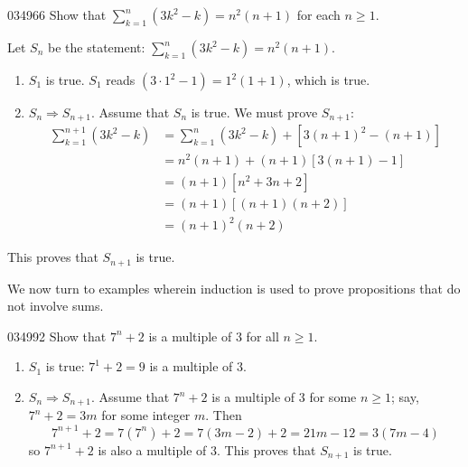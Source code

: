 \begin{example}{}{034966}
Show that $\sum_{k=1}^{n} (3k^2-k) = n^2(n+1)$ for each $n \geq 1$.


\begin{solution}
  Let $S_{n}$ be the statement: $\sum_{k=1}^{n} (3k^2-k) = n^2(n+1)$.


\begin{enumerate}
\item $S_{1}$ is true. $S_{1}$ reads $(3 \cdot 1^2 - 1) = 1^{2}(1 + 1)$, which is true.

\item $S_{n} \Rightarrow S_{n+1}$. Assume that $S_{n}$ is true. We must prove $S_{n+1}$:
\begin{align*}
\sum_{k=1}^{n+1} (3k^2-k) &= \sum_{k=1}^{n}(3k^2-k) + [3(n+1)^2 - (n+1)] \\
& = n^2(n+1)+(n+1)[3(n+1)-1] \tag{using $S_n$} \\
& = (n+1)[n^2 + 3n+2]\\
& = (n+1)[(n+1)(n+2)] \\
& = (n+1)^2(n+2)
\end{align*}
\end{enumerate}

This proves that $S_{n+1}$ is true.
\end{solution}
\end{example}

\noindent We now turn to examples wherein induction is used to prove propositions that do not involve sums.


\begin{example}{}{034992}
Show that $7^n + 2$ is a multiple of $3$ for all $n \geq 1$.


\begin{solution}
  


\begin{enumerate}
\item $S_{1}$ is true: $7^1 + 2 = 9$ is a multiple of $3$.

\item $S_{n} \Rightarrow S_{n+1}$. Assume that $7^n + 2$ is a multiple of $3$ for some $n \geq 1$; say, $7^n + 2 = 3m$ for some integer $m$. Then
\begin{equation*}
7^{n+1} +2 = 7(7^n) +2 = 7(3m-2)+2 = 21m-12 = 3(7m-4)
\end{equation*}
so $7^{n+1} + 2$ is also a multiple of $3$. This proves that $S_{n+1}$ is true.

\end{enumerate}
\end{solution}
\end{example}

